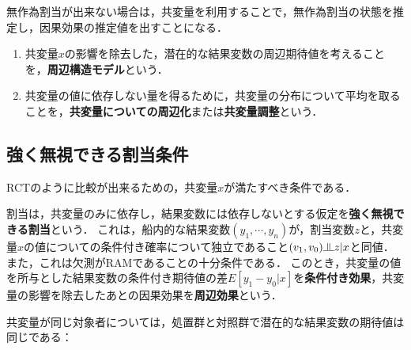 \documentclass[uplatex,dvipdfmx]{jsreport}
\begin{document}
\begin{tcolorbox}[colframe=ForestGreen, colback=ForestGreen!10!white,breakable,colbacktitle=ForestGreen!40!white,coltitle=black,fonttitle=\bfseries\sffamily,
title=]
無作為割当が出来ない場合は，共変量を利用することで，無作為割当の状態を推定し，因果効果の推定値を出すことになる．
\end{tcolorbox}

\begin{definition}\mbox{}
    \begin{enumerate}
        \item 共変量$x$の影響を除去した，潜在的な結果変数の周辺期待値を考えることを，\textbf{周辺構造モデル}という．
        \item 共変量の値に依存しない量を得るために，共変量の分布について平均を取ることを，\textbf{共変量についての周辺化}または\textbf{共変量調整}という．
    \end{enumerate}
\end{definition}

\subsection{強く無視できる割当条件}

\begin{tcolorbox}[colframe=ForestGreen, colback=ForestGreen!10!white,breakable,colbacktitle=ForestGreen!40!white,coltitle=black,fonttitle=\bfseries\sffamily,
title=]
    RCTのように比較が出来るための，共変量$x$が満たすべき条件である．
\end{tcolorbox}

\begin{axiom}
    割当は，共変量のみに依存し，結果変数には依存しないとする仮定を\textbf{強く無視できる割当}という．
    これは，船内的な結果変数$(y_1,\cdots,y_n)$が，割当変数$z$と，共変量$x$の値についての条件付き確率について独立であること$(v_1,v_0)\indep z|x$と同値．
    また，これは欠測がRAMであることの十分条件である．
    このとき，共変量の値を所与とした結果変数の条件付き期待値の差$E[y_1-y_0|x]$を\textbf{条件付き効果}，共変量の影響を除去したあとの因果効果を\textbf{周辺効果}という．
\end{axiom}

\begin{lemma}
    共変量が同じ対象者については，処置群と対照群で潜在的な結果変数の期待値は同じである：
\end{lemma}
\end{document}

